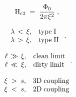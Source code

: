 \setcounter{chapter}{3}
{\newpage
\clearpage
\samepage \begin{figure}\vspace{14cm}
%









\label{fig:meiss}
\end{figure}
}

{\newpage
\clearpage
\samepage \begin{equation}\rm H_{c2}\; = \; \frac{\Phi_0}{2\pi \xi^2} \; ,
\label{cohlen}
\end{equation}
}

{\newpage
\clearpage
\samepage \begin{displaymath}\begin{array}{ll}
\lambda \, < \, \xi, & \rm type \;  I \\ 
\lambda \, > \, \xi, & \rm type \; II
   \end{array} \; .
\end{displaymath}
}

{\newpage
\clearpage
\samepage \begin{displaymath}\begin{array}{ll}
\ell \, \gg \, \xi, & \rm clean \; limit \\ 
\ell \, \ll \, \xi, & \rm dirty \; limit 
   \end{array} \; .
\end{displaymath}
}

{\newpage
\clearpage
\samepage \begin{displaymath}\begin{array}{ll}
\xi \; > \; s, & \rm 3D \; coupling\\ 
\xi \; < \; s, & \rm 2D \; coupling
   \end{array}
\end{displaymath}
}

{\newpage
\clearpage
\samepage \begin{figure}\vspace{5in}

\label{fig:holder}
\end{figure}
}

